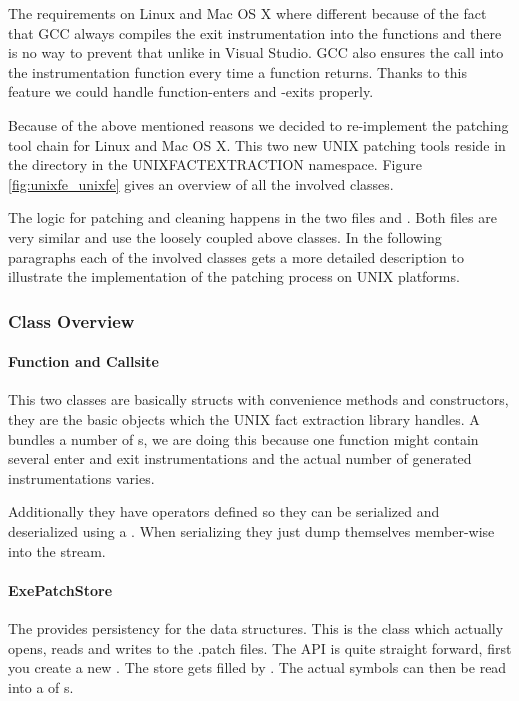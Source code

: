 The requirements on Linux and Mac OS X where different because of the fact that GCC always compiles the exit instrumentation into the functions and there is no way to prevent that unlike in Visual Studio.  GCC also ensures the call into the instrumentation function every time a function returns.  Thanks to this feature we could handle function-enters and -exits properly.

Because of the above mentioned reasons we decided to re-implement the patching tool chain for Linux and Mac OS X.  This two new UNIX patching tools reside in the  directory in the UNIXFACTEXTRACTION namespace.  Figure \ref{fig:unixfe_unixfe} gives an overview of all the involved classes.

The logic for patching and cleaning happens in the two files  and .  Both files are very similar and use the loosely coupled above classes.  In the following paragraphs each of the involved classes gets a more detailed description to illustrate the implementation of the patching process on UNIX platforms.

\subsubsection{Class Overview}

\paragraph{Function and Callsite}

This two classes are basically structs with convenience methods and constructors, they are the basic objects which the UNIX fact extraction library handles.  A  bundles a number of s, we are doing this because one function might contain several enter and exit instrumentations and the actual number of generated instrumentations varies.

Additionally they have operators defined so they can be serialized and deserialized using a .  When serializing they just dump themselves member-wise into the stream.

\paragraph{ExePatchStore}

The  provides persistency for the data structures.  This is the class which actually opens, reads and writes to the .patch files.  The API is quite straight forward, first you create a new .  The store gets filled by .  The actual symbols can then be read into a  of s.

